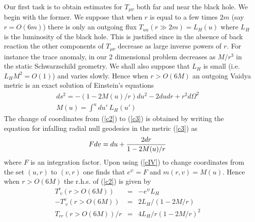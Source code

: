 \documentclass[12pt,oneside]{report}
\begin{document}
Our first task is to obtain estimates for $T_{\mu\nu}$ both far and near
the black hole. We begin with the former. We suppose that when $r$
is equal to a few times $2m$ (say $r=O(6m)$) there is only an outgoing flux
$T_{uu}(r\gg 2m)=L_H(u)$ where $L_H $ is the luminosity of the black
hole. This is
justified since in the absence of back reaction the other components of
$T_{\mu\nu}$ decrease as large inverse powers of $r$. For instance the trace
anomaly, in our 
2 dimensional problem decreases as $M/r^3$ in the static Schwarzschild
geometry. 
 We shall also suppose that $L_H$ is small 
(i.e. $L_H M^2 =O(1)$) and
varies slowly. Hence when $r>O(6M)$ an outgoing Vaidya metric is an exact
solution of Einstein's equations \begin{eqnarray} &ds^2 = -(1-2 M(u)/ 
r)du^2 - 2 du dr +r^2 d\Omega^2&\nonumber\\ &M(u) = \int^u \! du' \
L_H(u')&\label{c3} \end{eqnarray} 
The change of coordinates from (\ref{c2}) to (\ref{c3})
is obtained by writing the equation for infalling radial null geodesics in
the metric (\ref{c3}) as
\begin{equation}
F dv = du +  {2 dr\over 1 - 2 M(u)/r}\label{cIV}
\end{equation}
where $F$ is an integration factor. Upon using (\ref{cIV}) to change
coordinates from the set $(u,r)$ to $(v,r)$ one
finds that $e^{\psi}=F$ and $m(r,v)=M(u)$. 
Hence when $r>O(6M)$ the r.h.s. of (\ref{c2})
is given by
\begin{eqnarray}
T^r_{\ v}(r>O(6M)) &=& -e^\psi L_H\nonumber\\ 
-T^v_{\ v}(r>O(6M)) &=& 2 L_H/(1-2M/r)\nonumber\\
T_{rr}(r>O(6M))/r &=& 4 L_H / r (1-2M/r)^2\label{cc}\end{eqnarray}
\end{document}
